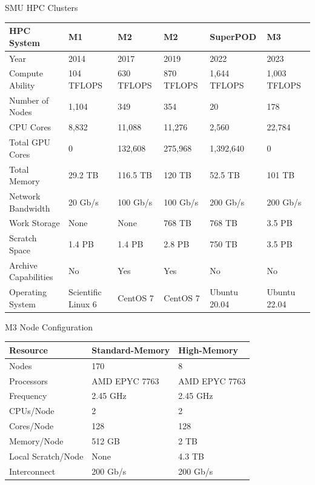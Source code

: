 \begin{frame}{SMU HPC Clusters}
\begin{table}
\scriptsize
\begin{tabular}{llllll}
\toprule
HPC System & M1 & M2 & M2 & SuperPOD & M3 \\
\midrule
Year & 2014 & 2017 & 2019 & 2022 & 2023 \\
Compute Ability & 104 TFLOPS & 630 TFLOPS & 870 TFLOPS & 1,644 TFLOPS &
1,003 TFLOPS \\
Number of Nodes & 1,104 & 349 & 354 & 20 & 178 \\
CPU Cores & 8,832 & 11,088 & 11,276 & 2,560 & 22,784 \\
Total GPU Cores & 0 & 132,608 & 275,968 & 1,392,640 & 0 \\
Total Memory & 29.2 TB & 116.5 TB & 120 TB & 52.5 TB & 101 TB \\
Network Bandwidth & 20 Gb/s & 100 Gb/s & 100 Gb/s & 200 Gb/s & 200
Gb/s \\
Work Storage & None & None & 768 TB & 768 TB & 3.5 PB \\
Scratch Space & 1.4 PB & 1.4 PB & 2.8 PB & 750 TB & 3.5 PB \\
Archive Capabilities & No & Yes & Yes & No & No \\
Operating System & Scientific Linux 6 & CentOS 7 & CentOS 7 & Ubuntu
20.04 & Ubuntu 22.04 \\
\bottomrule
\end{tabular}
\end{table}
\end{frame}

\begin{frame}{M3 Node Configuration}
\begin{table}
\begin{tabular}{lll}
\toprule
Resource & Standard-Memory & High-Memory \\
\midrule
Nodes & 170 & 8 \\
Processors & AMD EPYC 7763 & AMD EPYC 7763 \\
Frequency & 2.45 GHz & 2.45 GHz \\
CPUs/Node & 2 & 2 \\
Cores/Node & 128 & 128 \\
Memory/Node & 512 GB & 2 TB \\
Local Scratch/Node & None & 4.3 TB \\
Interconnect & 200 Gb/s & 200 Gb/s \\
\bottomrule
\end{tabular}
\end{table}
\end{frame}



